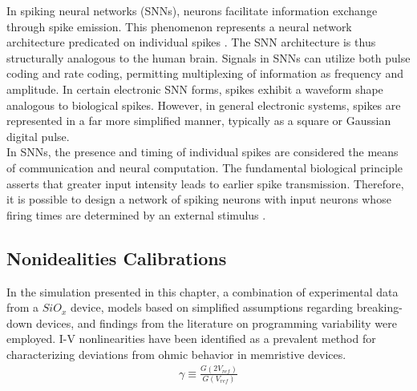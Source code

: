 In spiking neural networks (SNNs), neurons facilitate information exchange through spike emission. This phenomenon represents a neural network architecture predicated on individual spikes \cite{liu2014memristor}. The SNN architecture is thus structurally analogous to the human brain. Signals in SNNs can utilize both pulse coding and rate coding, permitting multiplexing of information as frequency and amplitude. In certain electronic SNN forms, spikes exhibit a waveform shape analogous to biological spikes. However, in general electronic systems, spikes are represented in a far more simplified manner, typically as a square or Gaussian digital pulse.\\

\noindent In SNNs, the presence and timing of individual spikes are considered the means of communication and neural computation. The fundamental biological principle asserts that greater input intensity leads to earlier spike transmission. Therefore, it is possible to design a network of spiking neurons with input neurons whose firing times are determined by an external stimulus \cite{serrano2013stdp}.

\subsection[Nonidealities Calibrations]{Nonidealities Calibrations}

\noindent In the simulation presented in this chapter, a combination of experimental data from a $SiO_x$ device, models based on simplified assumptions regarding breaking-down devices, and findings from the literature on programming variability were employed. I-V nonlinearities have been identified as a prevalent method for characterizing deviations from ohmic behavior in memristive devices.
\begin{align}
\gamma \equiv \frac{G\left( 2V_{ref} \right)}{G\left( V_{ref} \right)}  \label{eq:6.35}
\end{align}


